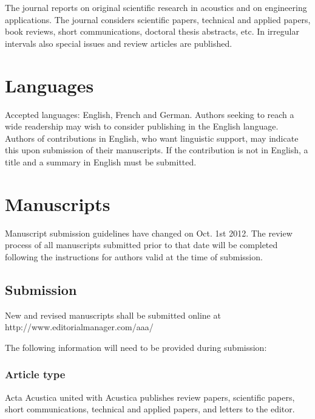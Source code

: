 \documentclass[twoside,twocolumn]{article}
\begin{document}
The journal reports on original scientific research in acoustics and on
engineering applications. The journal considers scientific papers,
technical and applied papers, book reviews, short communications,
doctoral thesis abstracts, etc. In irregular intervals also special
issues and review articles are published.

\section{Languages}

Accepted languages: English, French and German. Authors seeking to reach
a wide readership may wish to consider publishing in the English
language. Authors of contributions in English, who want linguistic
support, may indicate this upon submission of their manuscripts. If the
contribution is not in English, a title and a summary in English must be
submitted.

\section{Manuscripts}

Manuscript submission guidelines have changed on Oct. 1st 2012. The
review process of all manuscripts submitted prior to that date will be
completed following the instructions for authors valid at the time of
submission.

\subsection{Submission}

New and revised manuscripts shall be submitted online at
http://www.editorialmanager.com/aaa/

The following information will need to be provided during submission:

\subsubsection{Article type}

Acta Acustica united with Acustica publishes review papers, scientific
papers, short communications, technical and applied papers, and letters
to the editor.
\end{document}
